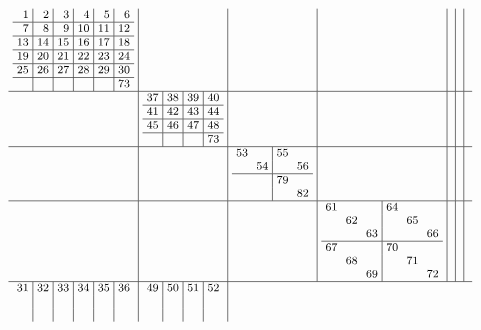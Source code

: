 \documentclass[12pt,a4paper,landscape]{amsart}
\begin{document}
\begin{align*}\footnotesize\arraycolsep3pt
\begin{array}{c|c|c|c|c|c|c}
\begin{array}{r|r|r|r|r|r}%
1&2&3&4&5&6\\\hline%
7&8&9&10&11&12\\\hline%
13&14&15&16&17&18\\\hline%
19&20&21&22&23&24\\\hline%
25&26&27&28&29&30\\\hline%
  &  &  &  &  &73\\%
\end{array}%
&&&&&&\\\hline
&
\begin{array}{r|r|r|r}%
37&38&39&40\\\hline%
41&42&43&44\\\hline%
45&46&47&48\\\hline%
  &  &  &73\\%
\end{array}%
&&&&&\\\hline
&&
\begin{array}{rr|rr}%
53&  &55&  \\%
  &54&  &56\\\hline%
  &  &79&  \\%
  &  &  &82\\%
\end{array}%
&&&&\\\hline
&&&
\begin{array}{rrr|rrr}%
61&  &  &64&  &  \\%
  &62&  &  &65&  \\%
  &  &63&  &  &66\\\hline%
67&  &  &70&  &  \\%
  &68&  &  &71&  \\%
  &  &69&  &  &72\\%
\end{array}%
&&&\\\hline
\begin{array}{r|r|r|r|r|r}%
31&32&33&34&35&36\\%
  &  &  &  &  &  \\%
  &  &  &  &  &  \\%
\end{array}%
&
\begin{array}{r|r|r|r}%
49&50&51&52\\%
  &  &  &  \\%
  &  &  &  \\%

\end{array}
\end{array}
\end{align*}
\end{document}
